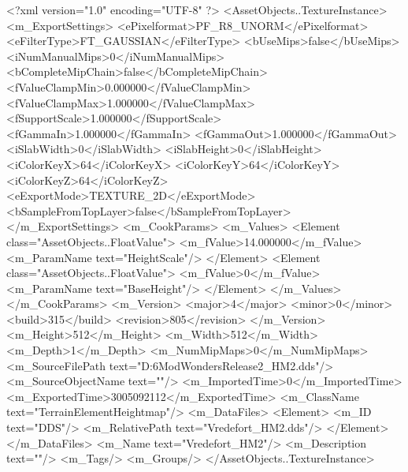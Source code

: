 <?xml version="1.0" encoding="UTF-8" ?>
<AssetObjects..TextureInstance>
	<m_ExportSettings>
		<ePixelformat>PF_R8_UNORM</ePixelformat>
		<eFilterType>FT_GAUSSIAN</eFilterType>
		<bUseMips>false</bUseMips>
		<iNumManualMips>0</iNumManualMips>
		<bCompleteMipChain>false</bCompleteMipChain>
		<fValueClampMin>0.000000</fValueClampMin>
		<fValueClampMax>1.000000</fValueClampMax>
		<fSupportScale>1.000000</fSupportScale>
		<fGammaIn>1.000000</fGammaIn>
		<fGammaOut>1.000000</fGammaOut>
		<iSlabWidth>0</iSlabWidth>
		<iSlabHeight>0</iSlabHeight>
		<iColorKeyX>64</iColorKeyX>
		<iColorKeyY>64</iColorKeyY>
		<iColorKeyZ>64</iColorKeyZ>
		<eExportMode>TEXTURE_2D</eExportMode>
		<bSampleFromTopLayer>false</bSampleFromTopLayer>
	</m_ExportSettings>
	<m_CookParams>
		<m_Values>
			<Element class="AssetObjects..FloatValue">
				<m_fValue>14.000000</m_fValue>
				<m_ParamName text="HeightScale"/>
			</Element>
			<Element class="AssetObjects..FloatValue">
				<m_fValue>0</m_fValue>
				<m_ParamName text="BaseHeight"/>
			</Element>
		</m_Values>
	</m_CookParams>
	<m_Version>
		<major>4</major>
		<minor>0</minor>
		<build>315</build>
		<revision>805</revision>
	</m_Version>
	<m_Height>512</m_Height>
	<m_Width>512</m_Width>
	<m_Depth>1</m_Depth>
	<m_NumMipMaps>0</m_NumMipMaps>
	<m_SourceFilePath text="D:\Civ6Mod\Terrain\NW\Natural Wonders\TM Release2\Vredefort\Vredefort_HM2.dds"/>
	<m_SourceObjectName text=""/>
	<m_ImportedTime>0</m_ImportedTime>
	<m_ExportedTime>3005092112</m_ExportedTime>
	<m_ClassName text="TerrainElementHeightmap"/>
	<m_DataFiles>
		<Element>
			<m_ID text="DDS"/>
			<m_RelativePath text="Vredefort_HM2.dds"/>
		</Element>
	</m_DataFiles>
	<m_Name text="Vredefort_HM2"/>
	<m_Description text=""/>
	<m_Tags/>
	<m_Groups/>
</AssetObjects..TextureInstance>


